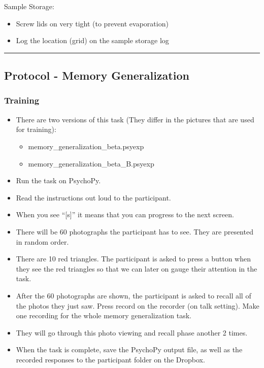\documentclass[]{book}
\providecommand{\tightlist}{%
  \setlength{\itemsep}{0pt}\setlength{\parskip}{0pt}}
\begin{document}
Sample Storage:

\begin{itemize}
\tightlist
\item
  Screw lids on very tight (to prevent evaporation)
\item
  Log the location (grid) on the sample storage log
\end{itemize}

\begin{center}\rule{0.5\linewidth}{0.5pt}\end{center}

\hypertarget{protocol---memory-generalization}{%
\subsection{Protocol - Memory Generalization}\label{protocol---memory-generalization}}

\hypertarget{training}{%
\subsubsection{Training}\label{training}}

\begin{itemize}
\tightlist
\item
  There are two versions of this task (They differ in the pictures that are used for training):

  \begin{itemize}
  \tightlist
  \item
    memory\_generalization\_beta.psyexp
  \item
    memory\_generalization\_beta\_B.psyexp
  \end{itemize}
\item
  Run the task on PsychoPy.
\item
  Read the instructions out loud to the participant.
\item
  When you see ``{[}s{]}'' it means that you can progress to the next screen.
\item
  There will be 60 photographs the participant has to see. They are presented in random order.
\item
  There are 10 red triangles. The participant is asked to press a button when they see the red triangles so that we can later on gauge their attention in the task.
\item
  After the 60 photographs are shown, the participant is asked to recall all of the photos they just saw. Press record on the recorder (on talk setting). Make one recording for the whole memory generalization task.
\item
  They will go through this photo viewing and recall phase another 2 times.
\item
  When the task is complete, save the PsychoPy output file, as well as the recorded responses to the participant folder on the Dropbox.
\end{itemize}
\end{document}
